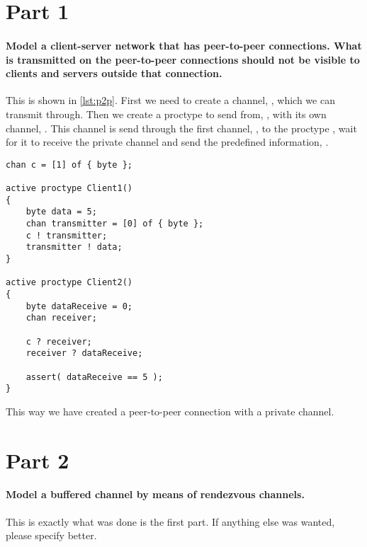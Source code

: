 \documentclass[Main]{subfiles}
\begin{document}
\section*{Part 1}
\paragraph{Model a client-server network that has peer-to-peer connections.
What is transmitted on the peer-to-peer connections should not be visible to clients and servers outside that connection.}

This is shown in \codeTitle \ref{lst:p2p}.
First we need to create a channel, , which we can transmit through.
Then we create a proctype to send from, , with its own channel, .
This channel is send through the first channel, , to the proctype , wait for it to receive the private channel and send the predefined information, .

\begin{lstlisting}[caption=Peer-to-peer network, style=Code-C, label=lst:p2p]
chan c = [1] of { byte }; 

active proctype Client1()
{
	byte data = 5;
	chan transmitter = [0] of { byte }; 
	c ! transmitter;
	transmitter ! data;
}

active proctype Client2()
{
	byte dataReceive = 0;
	chan receiver;

	c ? receiver;
	receiver ? dataReceive;
	
	assert( dataReceive == 5 );
}
\end{lstlisting}
This way we have created a peer-to-peer connection with a private channel.




\section*{Part 2}
\paragraph{Model a buffered channel by means of rendezvous channels.}

This is exactly what was done is the first part.
If anything else was wanted, please specify better.
\end{document}
